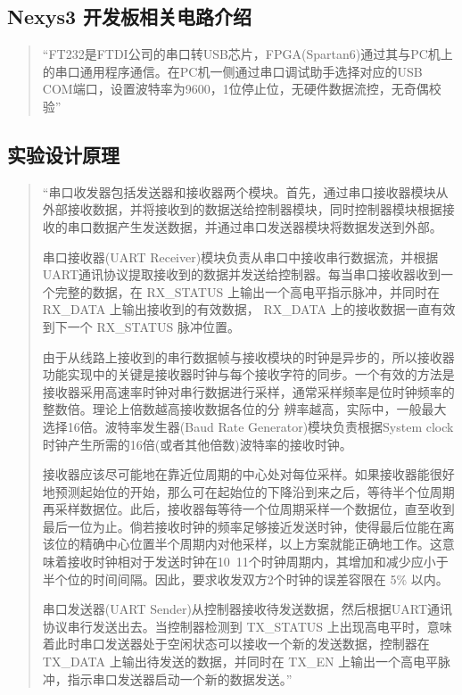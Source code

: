 \documentclass[11pt,a4paper]{article}
\begin{document}
\subsection{Nexys3 开发板相关电路介绍}
\begin{quotation}
  “FT232是FTDI公司的串口转USB芯片，FPGA(Spartan6)通过其与PC机上的串口通用程序通信。在PC机一侧通过串口调试助手选择对应的USB COM端口，设置波特率为9600，1位停止位，无硬件数据流控，无奇偶校验”
\end{quotation}

\subsection{实验设计原理}
\begin{quotation}
  “串口收发器包括发送器和接收器两个模块。首先，通过串口接收器模块从外部接收数据，并将接收到的数据送给控制器模块，同时控制器模块根据接收的串口数据产生发送数据，并通过串口发送器模块将数据发送到外部。

  串口接收器(UART Receiver)模块负责从串口中接收串行数据流，并根据UART通讯协议提取接收到的数据并发送给控制器。每当串口接收器收到一个完整的数据，在 RX\_STATUS 上输出一个高电平指示脉冲，并同时在 RX\_DATA 上输出接收到的有效数据， RX\_DATA 上的接收数据一直有效到下一个 RX\_STATUS 脉冲位置。

  由于从线路上接收到的串行数据帧与接收模块的时钟是异步的，所以接收器功能实现中的关键是接收器时钟与每个接收字符的同步。一个有效的方法是接收器采用高速率时钟对串行数据进行采样，通常采样频率是位时钟频率的整数倍。理论上倍数越高接收数据各位的分
  辨率越高，实际中，一般最大选择16倍。波特率发生器(Baud Rate Generator)模块负责根据System clock时钟产生所需的16倍(或者其他倍数)波特率的接收时钟。

  接收器应该尽可能地在靠近位周期的中心处对每位采样。如果接收器能很好地预测起始位的开始，那么可在起始位的下降沿到来之后，等待半个位周期再采样数据位。此后，接收器每等待一个位周期采样一个数据位，直至收到最后一位为止。倘若接收时钟的频率足够接近发送时钟，使得最后位能在离该位的精确中心位置半个周期内对他采样，以上方案就能正确地工作。这意味着接收时钟相对于发送时钟在10~11个时钟周期内，其增加和减少应小于半个位的时间间隔。因此，要求收发双方2个时钟的误差容限在 5\% 以内。

  串口发送器(UART Sender)从控制器接收待发送数据，然后根据UART通讯协议串行发送出去。当控制器检测到 TX\_STATUS 上出现高电平时，意味着此时串口发送器处于空闲状态可以接收一个新的发送数据，控制器在 TX\_DATA 上输出待发送的数据，并同时在 TX\_EN 上输出一个高电平脉冲，指示串口发送器启动一个新的数据发送。”
\end{quotation}
\end{document}
